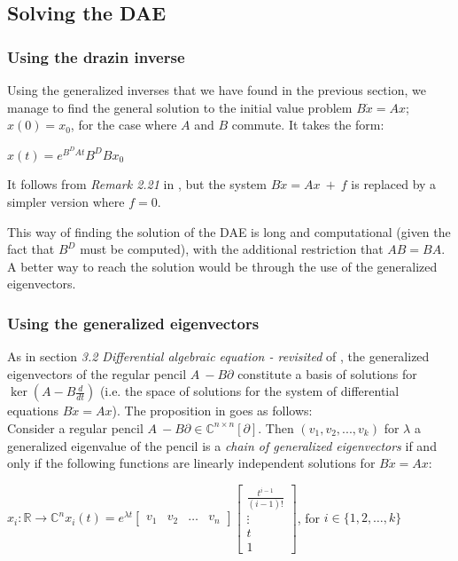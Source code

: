 
\subsection{Solving the DAE}
\subsubsection{Using the drazin inverse}

Using the generalized inverses that we have found in the previous section, we manage to find the general solution to the initial value problem $B\dot{x} = Ax$; $x(0) = x_0$, for the case where $A$ and $B$ commute. It takes the form:
\begin{center}
    $x(t) = e^{B^DAt}B^DBx_0$
\end{center}
It follows from \textit{Remark 2.21} in \cite{berger2012quasi}, but the system $B\dot{x} = Ax\ +\ f$ is replaced by a simpler version where $f = 0$.

This way of finding the solution of the DAE is long and computational (given the fact that $B^D$ must be computed), with the additional restriction that $AB = BA$. A better way to reach the solution would be through the use of the generalized eigenvectors.

\subsubsection{Using the generalized eigenvectors}
As in section \textit{3.2 Differential algebraic equation - revisited} of \cite{berger2012quasi}, the generalized eigenvectors of the regular pencil $A\ - B\partial$ constitute a basis of solutions for $\ker(A - B\frac{d}{dt})$ (i.e. the space of solutions for the system of differential equations $B\dot{x} = Ax$). The proposition in \cite{berger2012quasi} goes as follows:\\
Consider a regular pencil $A\ - B\partial \in \mathbb{C}^{n\times n}[\partial]$. Then $(v_1, v_2,..., v_k)$ for $\lambda$ a generalized eigenvalue of the pencil is a \textit{chain of generalized eigenvectors} if and only if the following functions are linearly independent solutions for $B\dot{x} = Ax$:
\begin{center}
    $x_i:\mathbb{R}\rightarrow \mathbb{C}^n$\quad $x_i(t) = e^{\lambda t}\begin{bmatrix}
        v_1 & v_2 &\dots& v_n
    \end{bmatrix} \begin{bmatrix}
        \frac{t^{i - 1}}{(i - 1)!} \\
        \vdots \\
        t \\
        1
    \end{bmatrix}$,
    for $i \in \{1, 2, \dots, k\}$
\end{center}

